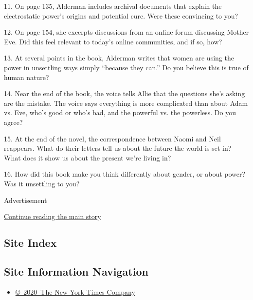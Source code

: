 11. On page 135, Alderman includes archival documents that explain the
electrostatic power's origins and potential cure. Were these convincing
to you?

12. On page 154, she excerpts discussions from an online forum
discussing Mother Eve. Did this feel relevant to today's online
communities, and if so, how?

13. At several points in the book, Alderman writes that women are using
the power in unsettling ways simply ``because they can.'' Do you believe
this is true of human nature?

14. Near the end of the book, the voice tells Allie that the questions
she's asking are the mistake. The voice says everything is more
complicated than about Adam vs. Eve, who's good or who's bad, and the
powerful vs. the powerless. Do you agree?

15. At the end of the novel, the correspondence between Naomi and Neil
reappears. What do their letters tell us about the future the world is
set in? What does it show us about the present we're living in?

16. How did this book make you think differently about gender, or about
power? Was it unsettling to you?

Advertisement

\protect\hyperlink{after-bottom}{Continue reading the main story}

\hypertarget{site-index}{%
\subsection{Site Index}\label{site-index}}

\hypertarget{site-information-navigation}{%
\subsection{Site Information
Navigation}\label{site-information-navigation}}

\begin{itemize}
\tightlist
\item
  \href{https://help.nytimes3xbfgragh.onion/hc/en-us/articles/115014792127-Copyright-notice}{©~2020~The
  New York Times Company}
\end{itemize}

